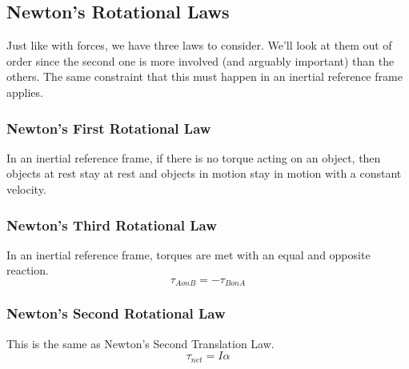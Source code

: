 \subsection{Newton's Rotational Laws}
Just like with forces, we have three laws to consider. We'll look at them out of order since the second one is more involved (and arguably important)
than the others. The same constraint that this must happen in an inertial reference frame applies.

\subsubsection{Newton's First Rotational Law}
In an inertial reference frame, if there is no torque acting on an object, then objects at rest stay at rest and objects in motion stay in motion with 
a constant velocity.

\subsubsection{Newton's Third Rotational Law}
In an inertial reference frame, torques are met with an equal and opposite reaction.
\begin{equation}
    \tau_{A on B} = - \tau_{B on A}
\end{equation}

\subsubsection{Newton's Second Rotational Law}
This is the same as Newton's Second Translation Law.
\begin{equation}
    \tau_{net} = I \alpha
\end{equation}